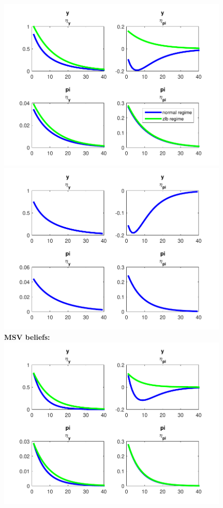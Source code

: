 \documentclass[12pt,reqno]{article}
\numberwithin{equation}{section}
\begin{document}
\begin{figure}[H]
\includegraphics[scale=0.6]{NKPC_ree_init_REE_MS_IR.pdf}
\includegraphics[scale=0.6]{NKPC_ree_init_REE_IR.pdf}\\

\textbf{MSV beliefs: }\\

\includegraphics[scale=0.6]{NKPC_ree_init_MSV_IR.pdf}\\






\end{figure}
\end{document}
